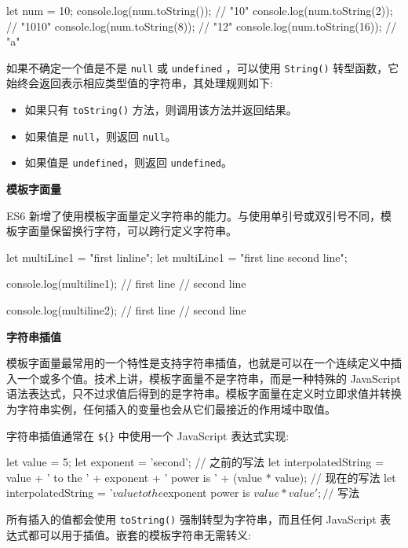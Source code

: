 \begin{JavaScript}
let num = 10;
console.log(num.toString());    // "10"
console.log(num.toString(2));   // "1010"
console.log(num.toString(8));   // "12"
console.log(num.toString(16));  // "a"
\end{JavaScript}

如果不确定一个值是不是 \texttt{null} 或 \texttt{undefined} ，可以使用 \texttt{String()} 转型函数，它始终会返回表示相应类型值的字符串，其处理规则如下:

\begin{itemize}
    \item 如果只有 \texttt{toString()} 方法，则调用该方法并返回结果。
    \item 如果值是 \texttt{null}，则返回 \texttt{null}。
    \item 如果值是 \texttt{undefined}，则返回 \texttt{undefined}。
\end{itemize}

\noindent\textbf{模板字面量}

ES6 新增了使用模板字面量定义字符串的能力。与使用单引号或双引号不同，模板字面量保留换行字符，可以跨行定义字符串。

\begin{JavaScript}
let multiLine1 = "first lin\nsecond line";
let multiLine1 = "first line
second line";

console.log(multiline1);
// first line
// second line

console.log(multiline2);
// first line
// second line
\end{JavaScript}

\noindent\textbf{字符串插值}

模板字面量最常用的一个特性是支持字符串插值，也就是可以在一个连续定义中插入一个或多个值。技术上讲，模板字面量不是字符串，而是一种特殊的 JavaScript 语法表达式，只不过求值后得到的是字符串。模板字面量在定义时立即求值并转换为字符串实例，任何插入的变量也会从它们最接近的作用域中取值。

字符串插值通常在 \texttt{\$\{\}} 中使用一个 JavaScript 表达式实现:

\begin{JavaScript}
let value = 5;
let exponent = 'second';
// 之前的写法
let interpolatedString = value + ' to the ' + exponent + ' power is ' + (value * value);
// 现在的写法
let interpolatedString = '${value} to the ${exponent} power is ${value*value}'; // $ 写法
\end{JavaScript}

所有插入的值都会使用 \texttt{toString()} 强制转型为字符串，而且任何 JavaScript 表达式都可以用于插值。嵌套的模板字符串无需转义:

